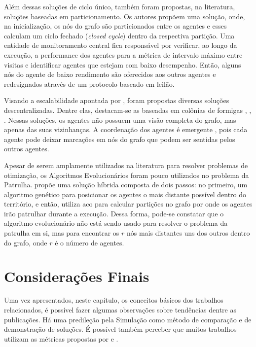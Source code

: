 Além dessas soluções de ciclo único, também foram propostas, na literatura, 
soluções baseadas em particionamento. Os autores 
\citep{Pippin:2013:PBT:2480362.2480378} propõem uma solução, onde, na 
inicialização, os nós do grafo são particionados entre os agentes e esses 
calculam um ciclo fechado (\textit{closed cycle}) dentro da respectiva partição. 
Uma entidade de monitoramento central fica responsável por verificar, ao longo 
da execução, a performance dos agentes para a métrica de intervalo máximo entre 
visitas e identificar agentes que estejam com baixo desempenho. Então, alguns 
nós do agente de baixo rendimento são oferecidos aos outros agentes e 
redesignados através de um protocolo baseado em leilão.

Visando a escalabilidade apontada por \citep{Almeida:2004:AAI}, foram propostas 
diversas soluções descentralizadas. Dentre elas, destacam-se as baseadas em 
colônias de formigas \citep{Koenig:2001:TCA:375735.376463}, 
\citep{Elor:2010:AMC:1884958.1884970}, \citep{6615158}. Nessas soluções, os 
agentes não possuem uma visão completa do grafo, mas apenas das suas 
vizinhanças. A coordenação dos agentes é emergente 
\citep{Machado:2002:MPE:1765317.1765332}, pois cada agente pode deixar marcações 
em nós do grafo que podem ser sentidas pelos outros agentes.

Apesar de serem amplamente utilizados na literatura para resolver problemas de 
otimização, os Algoritmos Evolucionários \citep{Luke2013Metaheuristics} foram 
pouco utilizados no problema da Patrulha. \citep{4630897} propõe uma solução 
híbrida composta de dois passos: no primeiro, um algoritmo genético para 
posicionar os agentes o mais distante possível dentro do território, e então, 
utiliza \ac{aco} para calcular partições no grafo por onde os agentes irão 
patrulhar durante a execução. Dessa forma, pode-se constatar que o algoritmo 
evolucionário não está sendo usado para resolver o problema da patrulha em si, 
mas para encontrar os $r$ nós mais distantes uns dos outros dentro do grafo, 
onde $r$ é o número de agentes.

\section{Considerações Finais}

Uma vez apresentados, neste capítulo, os conceitos básicos dos trabalhos 
relacionados, é possível fazer algumas observações sobre tendências dentre as 
publicações. Há uma predileção pela Simulação como método de comparação e de 
demonstração de soluções. É possível também perceber que muitos trabalhos 
utilizam as métricas propostas por \citep{Machado:2002:MPE:1765317.1765332} e 
\citep{sampaiophd}.

